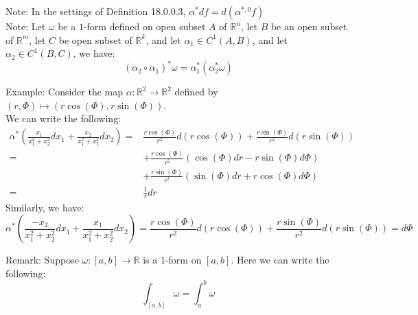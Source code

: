 \documentclass[15pt]{book}
\theoremstyle{break}
\theoremstyle{break}
\newcommand{\R}{\mathbb{R}}
\newcommand{\note}{\color{red}Note: \color{black}}
\newcommand{\remark}{\color{blue}Remark: \color{black}}
\newcommand{\example}{\color{green}Example: \color{black}}
\begin{document}
\note In the settings of Definition 18.0.0.3, $\alpha^*df = d(\alpha^{*,0}f)$\\

\note Let $\omega$ be a $1$-form defined on open subset $A$ of $\R^n$, let $B$ be an open subset of $\R^m$, let $C$ be open subset of $\R^k$, and let $\alpha_1 \in C^1(A,B)$, and let $\alpha_2 \in C^1(B,C)$, we have: 
$$(\alpha_2 \circ \alpha_1)^*\omega = \alpha_1^*(\alpha_2^*\omega)$$

\example Consider the map $\alpha:\R^2 \to \R^2$ defined by $(r,\Phi) \mapsto (r\cos(\Phi), r\sin(\Phi))$. \\We can write the following:
\begin{align*}
\alpha^* \left(\frac{x_1}{x_1^2+x_2^2}dx_1 + \frac{x_2}{x_1^2+x_2^2}dx_2  \right)=&\frac{r\cos(\Phi)}{r^2}d(r\cos(\Phi)) + \frac{r\sin(\Phi)}{r^2}d(r\sin(\Phi))\\
=&+\frac{r\cos(\Phi)}{r^2}(\cos(\Phi)dr - r\sin(\Phi) d\Phi)\\
 &+ \frac{r\sin(\Phi)}{r^2}(\sin(\Phi) dr + r\cos(\Phi)d\Phi)\\
=&\frac{1}{r}dr
\end{align*}
Similarly, we have:
$$\alpha^*  \left(\frac{-x_2}{x_1^2+x_2^2}dx_1 + \frac{x_1}{x_1^2+x_2^2}dx_2  \right)=\frac{r\cos(\Phi)}{r^2}d(r\cos(\Phi)) + \frac{r\sin(\Phi)}{r^2}d(r\sin(\Phi)) = d\Phi$$


\remark Suppose $\omega:[a,b]\to \R$ is a $1$-form on $[a,b]$. Here we can write the following:
$$\int_{[a,b]} \omega = \int_a^b \omega$$
\end{document}
